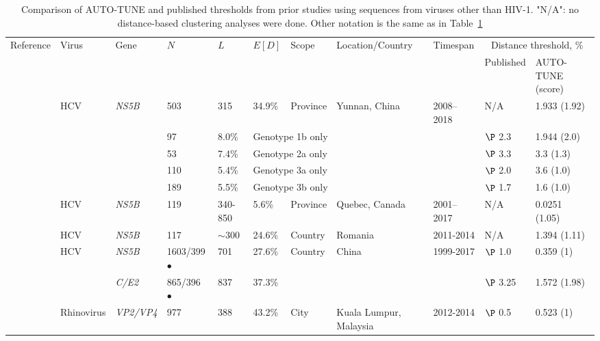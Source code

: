 \documentclass[utf8]{FrontiersinHarvard} %
\begin{document}
\begin{table}[h]
	\caption{Comparison of AUTO-TUNE and published thresholds from prior studies using sequences from viruses other than HIV-1. "N/A": no distance-based clustering analyses were done. Other notation is the same as in Table~\ref{tab:paperComparison}}
	
	\vspace{10pt}
	\centering
	\begin{ssmall}
	\label{tab:paperComparison}
	\begin{tabular}{lllllllllll}
	   \hline
		Reference     & Virus & Gene & $N$ & $L$ & $E[D]$ & Scope & Location/Country      & Timespan  & \multicolumn{2}{c}{Distance threshold, \%}\\
		     &  &       &  &  & & & & & Published & AUTO-TUNE (score) \\
		\hline
		\cite{Jia:2023aa} & HCV & {\it NS5B} & 503 & 315 & 34.9\% & Province & Yunnan, China & 2008–2018 & N/A & 1.933 (1.92)\\
		& & & 97 & 8.0\% & \multicolumn{4}{l}{Genotype 1b only}  & $\P$ 2.3 &  1.944 (2.0)\\
		& & & 53 & 7.4\% & \multicolumn{4}{l}{Genotype 2a only}  & $\P$ 3.3 &  3.3 (1.3)\\
		& & & 110 & 5.4\% & \multicolumn{4}{l}{Genotype 3a only}  & $\P$ 2.0 &  3.6 (1.0)\\
		& & & 189 & 5.5\% & \multicolumn{4}{l}{Genotype 3b only}  & $\P$ 1.7 &  1.6 (1.0)\\
		\cite{Murphy:2019aa} & HCV & {\it NS5B} & 119 & 340-850 & 5.6\% & Province & Quebec, Canada & 2001–2017 & N/A & 0.0251 (1.05)\\
		\cite{Paraschiv:2017aa} & HCV & {\it NS5B} & 117 & $\sim 300$ & 24.6\% & Country & Romania & 2011-2014& N/A & 1.394 (1.11)\\
		\cite{Ye:2023aa} & HCV & {\it NS5B} & 1603/399 $\bullet$ & 701 & 27.6\% & Country & China & 1999-2017 & $\P$ 1.0 & 0.359 (1) \\
		 &  & {\it C/E2} & 865/396 $\bullet$ & 837 & 37.3\% & & & &    $\P$ 3.25 & 1.572 (1.98) \\
		 \cite{Ng:2022aa} & Rhinovirus & {\it VP2/VP4} & 977 & 388 & 43.2\% & City & Kuala Lumpur, Malaysia & 2012-2014 & $\P$ 0.5 & 0.523 (1) \\
		
		\hline
	\end{tabular}
	\end{ssmall}
\end{table}
\end{document}
